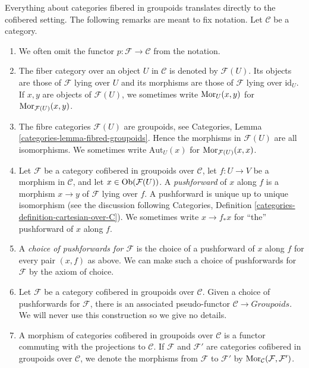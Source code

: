 \begin{remarks}
\label{remarks-cofibered-groupoids}
Everything about categories fibered in groupoids translates directly to the
cofibered setting. The following remarks are meant to fix notation.
Let $\mathcal{C}$ be a category.
\begin{enumerate}
\item We often omit the functor $p: \mathcal{F} \to \mathcal{C}$ from the
notation.
\item The fiber category over an object $U$ in $\mathcal{C}$ is denoted by
$\mathcal{F}(U)$. Its objects are those of $\mathcal{F}$ lying over $U$ and its
morphisms are those of $\mathcal{F}$ lying over $\text{id}_U$.
If $x, y$  are objects of $\mathcal{F}(U)$, we sometimes write
$\mathop{\rm Mor}\nolimits_U(x, y)$ for $\mathop{\rm Mor}\nolimits_{\mathcal{F}(U)}(x, y)$.
\item The fibre categories $\mathcal{F}(U)$ are groupoids, see
Categories, Lemma \ref{categories-lemma-fibred-groupoids}.
Hence the morphisms in $\mathcal{F}(U)$ are all isomorphisms.
We sometimes write $\text{Aut}_U(x)$ for $\mathop{\rm Mor}\nolimits_{\mathcal{F}(U)}(x, x)$.
\item
\label{item-pushforward}
Let $\mathcal{F}$ be a category cofibered in groupoids over
$\mathcal{C}$, let $f: U \to V$ be a morphism in $\mathcal{C}$, and
let $x \in \mathop{\rm Ob}\nolimits(\mathcal{F}(U))$.
A {\it pushforward} of $x$ along $f$ is a morphism
$x \to y$ of $\mathcal{F}$ lying over $f$. A pushforward
is unique up to unique isomorphism (see the discussion following
Categories, Definition \ref{categories-definition-cartesian-over-C}).
We sometimes write $x \to f_*x$ for ``the'' pushforward of $x$
along $f$.
\item A {\it choice of pushforwards for $\mathcal{F}$} is the choice of
a pushforward of $x$ along $f$ for every pair $(x, f)$ as above. We can make
such a choice of pushforwards for $\mathcal{F}$ by the axiom of choice.
\item Let $\mathcal{F}$ be a category cofibered in groupoids over
$\mathcal{C}$. Given a choice of pushforwards for $\mathcal{F}$, there
is an associated pseudo-functor $\mathcal{C} \to \textit{Groupoids}$.
We will never use this construction so we give no details.
\item
\label{item-cofibered-morphism}
A morphism of categories cofibered in groupoids over $\mathcal{C}$ is a
functor commuting with the projections to $\mathcal{C}$. If $\mathcal{F}$
and $\mathcal{F}'$ are categories cofibered in groupoids over
$\mathcal{C}$, we denote the morphisms from $\mathcal{F}$ to $\mathcal{F}'$
by $\mathop{\rm Mor}\nolimits_\mathcal{C}(\mathcal{F}, \mathcal{F}')$.

\end{enumerate}
\end{remarks}
